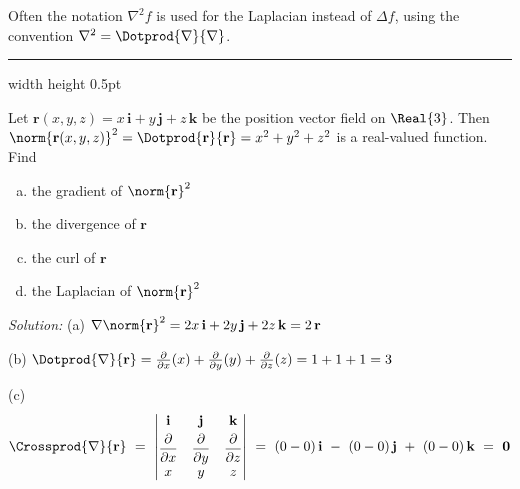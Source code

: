 Often the notation $\nabla^2 f$ is used for the Laplacian instead of $\Delta f$, using the convention
$\nabla^2 = \Dotprod{\nabla}{\nabla}$.\index{$\Delta$}

\vspace{3mm}
\hrule width \textwidth height 0.5pt
\begin{exa}\label{exa:laplposition}
 Let $\textbf{r}(x,y,z) = x\,\textbf{i} + y\,\textbf{j} + z\,\textbf{k}$ be the position vector field on
 $\Real{3}$. Then $\norm{\textbf{r}(x,y,z)}^2 = \Dotprod{\textbf{r}}{\textbf{r}} = x^2 + y^2 + z^2$ is a real-valued
 function. Find
 \begin{enumerate}[(a)]
  \item the gradient of $\norm{\textbf{r}}^2$
  \item the divergence of $\textbf{r}$
  \item the curl of $\textbf{r}$
  \item the Laplacian of $\norm{\textbf{r}}^2$
 \end{enumerate}
    \par\noindent \emph{Solution:} (a) $\nabla \norm{\textbf{r}}^2 = 2x\,\textbf{i} + 2y\,\textbf{j} + 2z\,\textbf{k}
  = 2\,\textbf{r}$\vspace{2mm}
 \par\noindent (b) $\Dotprod{\nabla}{\textbf{r}} = \frac{\partial}{\partial x}(x) + \frac{\partial}{\partial y}(y) +
  \frac{\partial}{\partial z}(z) = 1+1+1=3$\vspace{2mm}
 \par\noindent (c)
 \begin{displaymath}
  \Crossprod{\nabla}{\textbf{r}} ~=~ \begin{vmatrix}
  \textbf{i} & \textbf{j} & \textbf{k} \vspace{1mm}\\ \dfrac{\partial}{\partial x} & \dfrac{\partial}{\partial y} &
   \dfrac{\partial}{\partial z} \\
  x & y & z
 \end{vmatrix} ~=~ (0-0)\,\textbf{i} ~-~ (0-0)\,\textbf{j} ~+~ (0-0)\,\textbf{k} ~=~ \textbf{0}

\end{displaymath}
\end{exa}
